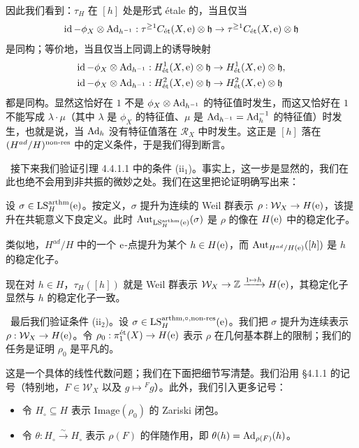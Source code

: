 因此我们看到：$\tau_H$ 在 $[h]$ 处是形式 étale 的，当且仅当
\[
  \id - \phi_X \otimes \Ad_{h^{-1}} : \tau^{\geq 1}C_{\et}(X,\e) \otimes \mathfrak{h} \to \tau^{\geq 1}C_{\et}(X,\e) \otimes \mathfrak{h}
\]
是同构；等价地，当且仅当上同调上的诱导映射
\begin{align*}
  \id - \phi_X \otimes \Ad_{h^{-1}} &: H^1_{\et}(X,\e) \otimes \mathfrak{h} \to H^1_{\et}(X,\e) \otimes \mathfrak{h},\\
  \id - \phi_X \otimes \Ad_{h^{-1}} &: H^2_{\et}(X,\e) \otimes \mathfrak{h} \to H^2_{\et}(X,\e) \otimes \mathfrak{h}
\end{align*}
都是同构。显然这恰好在 $1$ 不是 $\phi_X \otimes \Ad_{h^{-1}}$ 的特征值时发生，而这又恰好在 $1$ 不能写成 $\lambda \cdot \mu$（其中 $\lambda$ 是 $\phi_X$ 的特征值、$\mu$ 是 $\Ad_{h^{-1}} = \Ad_h^{-1}$ 的特征值）时发生，也就是说，当 $\Ad_h$ 没有特征值落在 $\mathcal{R}_X$ 中时发生。这正是 $[h]$ 落在 $(H^{ad}/H)^{\nonres}$ 中的定义条件，于是我们得到断言。

\ 接下来我们验证引理 4.4.1.1 中的条件 (ii$_1$)。事实上，这一步是显然的，我们在此也绝不会用到非共振的微妙之处。我们在这里把论证明确写出来：

设 $\sigma \in \LS^{\arthm}_H(\e)$。按定义，$\sigma$ 提升为连续的 Weil 群表示 $\rho : \mathcal{W}_X \to H(\e)$，该提升在共轭意义下良定义。此时 $\Aut_{\LS^{\arthm}_H(\e)}(\sigma)$ 是 $\rho$ 的像在 $H(\e)$ 中的稳定化子。

类似地，$H^{ad}/H$ 中的一个 $\e$-点提升为某个 $h \in H(\e)$，而 $\Aut_{H^{ad}/H(\e)}([h])$ 是 $h$ 的稳定化子。

现在对 $h \in H$，$\tau_H([h])$ 就是 Weil 群表示 $\mathcal{W}_X \to \ZZ \xrightarrow{1 \mapsto h} H(\e)$，其稳定化子显然与 $h$ 的稳定化子一致。

\ 最后我们验证条件 (ii$_2$)。设 $\sigma \in \LS^{\arthm,\circ,\nonres}_H(\e)$。我们把 $\sigma$ 提升为连续表示 $\rho : \mathcal{W}_X \to H(\e)$。令 $\rho_0 : \pi_1^{\et}(X) \to H(\e)$ 表示 $\rho$ 在几何基本群上的限制；我们的任务是证明 $\rho_0$ 是平凡的。

这是一个具体的线性代数问题；我们在下面把细节写清楚。我们沿用 §4.1.1 的记号（特别地，$F \in \mathcal{W}_X$ 以及 $g \mapsto {}^F g$）。此外，我们引入更多记号：
\begin{itemize}
  \item 令 $H_\circ \subseteq H$ 表示 $\mathrm{Image}(\rho_0)$ 的 Zariski 闭包。
  \item 令 $\theta : H_\circ \xrightarrow{\ \sim\ } H_\circ$ 表示 $\rho(F)$ 的伴随作用，即 $\theta(h) = \Ad_{\rho(F)}(h)$。
\end{itemize}

